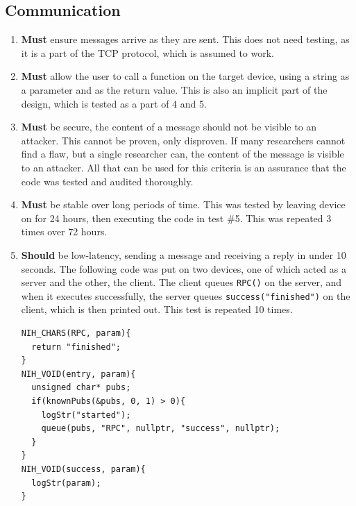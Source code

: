 \documentclass{article}
\begin{document}
\subsection{Communication}
\begin{enumerate}
\item \textbf{Must} ensure messages arrive as they are sent. This does not need testing, as it is a part of the TCP protocol, which is assumed to work.
\item \textbf{Must} allow the user to call a function on the target device, using a
string as a parameter and as the return value. This is also an implicit part of the design, which is tested as a part of 4 and 5.
\item \textbf{Must} be secure, the content of a message should not be visible to
an attacker. This cannot be proven, only disproven. If many researchers cannot find a flaw, but a single researcher can, the content of the message is visible to an attacker. All that can be used for this criteria is an assurance that the code was tested and audited thoroughly.
\item \textbf{Must} be stable over long periods of time. This was tested by leaving device on for 24 hours, then executing the code in test \#5. This was repeated 3 times over 72 hours.
\item \textbf{Should} be low-latency, sending a message and receiving a reply in under 10 seconds. The following code was put on two devices, one of which acted as a server and the other, the client. The client queues \texttt{RPC()} on the server, and when it executes successfully, the server queues \texttt{success("finished")} on the client, which is then printed out. This test is repeated 10 times.

\begin{tcolorbox}[colback=white,grow to left by=2.5mm,grow to right by=2.5mm,left*=0mm,right*=0mm,sharp corners]
\begin{verbatim}
NIH_CHARS(RPC, param){
  return "finished";
}
NIH_VOID(entry, param){
  unsigned char* pubs;
  if(knownPubs(&pubs, 0, 1) > 0){
    logStr("started");
    queue(pubs, "RPC", nullptr, "success", nullptr);
  }
}
NIH_VOID(success, param){
  logStr(param);
}
\end{verbatim}
\end{tcolorbox}


\end{enumerate}
\end{document}
